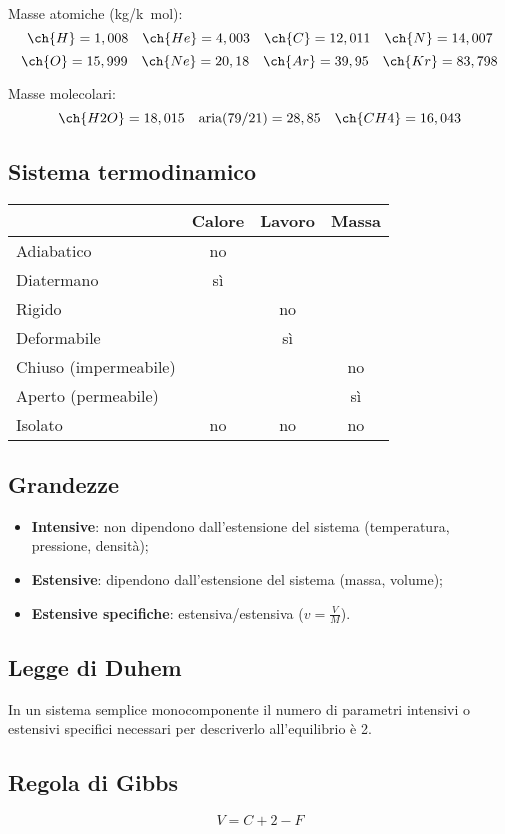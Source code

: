 Masse atomiche (\si{kg/k mol}):
\[ \ch{H} = \si{1,008} \quad \ch{He} = \si{4,003} \quad \ch{C} = \si{12,011} \quad \ch{N} = \si{14,007} \]
\[ \ch{O} = \si{15,999} \quad \ch{Ne} = \si{20,18} \quad \ch{Ar} = \si{39,95} \quad \ch{Kr} = \si{83,798} \]

Masse molecolari:
\[ \ch{H2O} = \si{18,015} \quad \text{aria}(79/21) = 28,85 \quad \ch{CH4} = \si{16,043} \]

\subsection{Sistema termodinamico}
\begin{tabular}{lccc}
    \toprule
    & Calore & Lavoro & Massa\\ \midrule
    Adiabatico & no & & \\
    Diatermano & sì & & \\
    Rigido & & no & \\
    Deformabile & & sì & \\
    Chiuso (impermeabile) & & & no \\
    Aperto (permeabile) & & & sì \\
    Isolato & no & no & no \\
    \bottomrule
\end{tabular}

\subsection{Grandezze}
\begin{itemize}
    \item \textbf{Intensive}: non dipendono dall'estensione del sistema (temperatura, pressione, densità);
    \item \textbf{Estensive}: dipendono dall'estensione del sistema (massa, volume);
    \item \textbf{Estensive specifiche}: estensiva/estensiva ($v = \frac{V}{M}$).
\end{itemize}

\subsection{Legge di Duhem}
In un sistema semplice monocomponente il numero di parametri intensivi o estensivi specifici
necessari per descriverlo all'equilibrio è 2.


\subsection{Regola di Gibbs}
\[V = C + 2 - F\]

